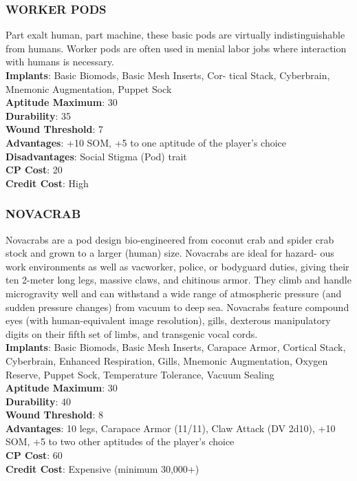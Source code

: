 \subsubsection{WORKER PODS}
Part exalt human, part machine, these basic pods are
virtually indistinguishable from humans. Worker pods
are often used in menial labor jobs where interaction
with humans is necessary.
\\ \textbf{Implants}: Basic Biomods, Basic Mesh Inserts, Cor-
tical Stack, Cyberbrain, Mnemonic Augmentation,
Puppet Sock
\\ \textbf{Aptitude Maximum}: 30
\\ \textbf{Durability}: 35
\\ \textbf{Wound Threshold}: 7
\\ \textbf{Advantages}: +10 SOM, +5 to one aptitude of the
player’s choice
\\ \textbf{Disadvantages}: Social Stigma (Pod) trait
\\ \textbf{CP Cost}: 20
\\ \textbf{Credit Cost}: High

\subsubsection{NOVACRAB}
Novacrabs are a pod design bio-engineered from
coconut crab and spider crab stock and grown to a
larger (human) size. Novacrabs are ideal for hazard-
ous work environments as well as vacworker, police,
or bodyguard duties, giving their ten 2-meter long legs,
massive claws, and chitinous armor. They climb and
handle microgravity well and can withstand a wide
range of atmospheric pressure (and sudden pressure
changes) from vacuum to deep sea. Novacrabs feature
compound eyes (with human-equivalent image resolution), gills, dexterous manipulatory digits on their fifth
set of limbs, and transgenic vocal cords.
\\ \textbf{Implants}: Basic Biomods, Basic Mesh Inserts, Carapace Armor, Cortical Stack, Cyberbrain, Enhanced Respiration, Gills, Mnemonic Augmentation,
Oxygen Reserve, Puppet Sock, Temperature Tolerance, Vacuum Sealing
\\ \textbf{Aptitude Maximum}: 30
\\ \textbf{Durability}: 40
\\ \textbf{Wound Threshold}: 8
\\ \textbf{Advantages}: 10 legs, Carapace Armor (11/11), Claw
Attack (DV 2d10), +10 SOM, +5 to two other aptitudes of the player’s choice
\\ \textbf{CP Cost}: 60
\\ \textbf{Credit Cost}: Expensive (minimum 30,000+)



